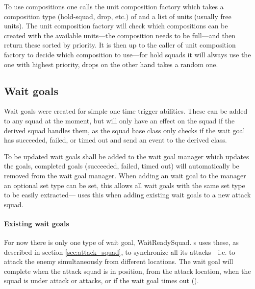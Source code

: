 To use compositions one calls the unit composition factory which takes a composition type (hold-squad, drop, etc.) of and a list of units (usually free units). The unit composition factory will check which compositions can be created with the available units—the composition needs to be full—and then return these sorted by priority. It is then up to the caller of unit composition factory to decide which composition to use—for hold squads it will always use the one with highest priority, drops on the other hand takes a random one.

\subsection{Wait goals}
\label{sec:wait_goals}
Wait goals were created for simple one time trigger abilities. These can be added to any squad at the moment, but will only have an effect on the squad if the derived squad handles them, as the squad base class only checks if the wait goal has succeeded, failed, or timed out and send an event to the derived class.

To be updated wait goals shall be added to the wait goal manager which updates the goals, completed goals (succeeded, failed, timed out) will automatically be removed from the wait goal manager. When adding an wait goal to the manager an optional set type can be set, this allows all wait goals with the same set type to be easily extracted— uses this when adding existing wait goals to a new attack squad.

\paragraph{Existing wait goals}
For now there is only one type of wait goal, WaitReadySquad. s uses these, as described in section \ref{sec:attack_squad}, to synchronize all its attacks—i.e. to attack the enemy simultaneously from different locations. The wait goal will complete when the attack squad is in position, \squadAttackWaitingPositionDistanceFromGoal from the attack location, when the squad is under attack or attacks, or if the wait goal times out (\attackCoordinatorWaitGoalTimeout).
